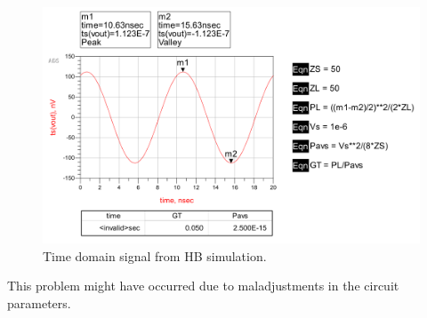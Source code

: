 \begin{figure}[H] 
\centering
\includegraphics[width=12cm]{images/HB.png}
\caption{Time domain signal from HB simulation.}
\label{p4:HB} 
\end{figure}

This problem might have occurred due to maladjustments in the circuit parameters.